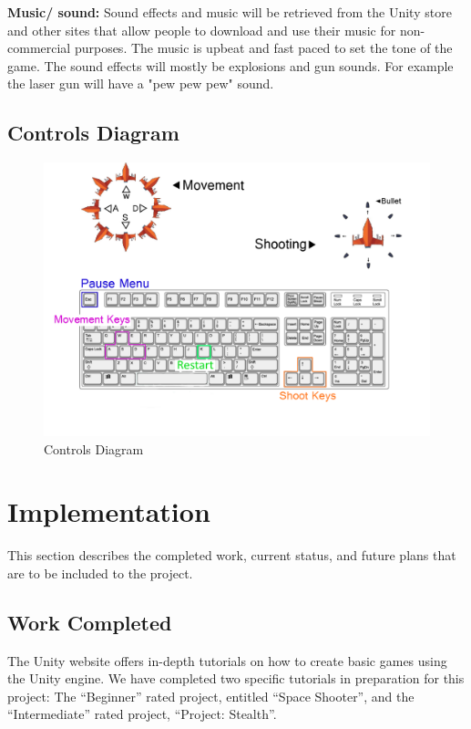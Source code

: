 \documentclass[12pt]{article}       %
\def\hs{\hspace{15pt}}
\begin{document}
	{\bf Music/ sound:} Sound effects and music will be retrieved from the Unity store and other sites that allow people to download and use their music for non-commercial purposes. The music is upbeat and fast paced to set the tone of the game. The sound effects will mostly be explosions and gun sounds. For example the laser gun will have a "pew pew pew" sound. 


\subsection{Controls Diagram}

\begin{figure} [H]
\centering
\includegraphics[width=6.3 in]{ControlDiagramFinal.png}
\caption{Controls Diagram} \label{Controls}
\end{figure}


\section{Implementation} %
\label{sec:history}
This section describes the completed work, current status, and future plans that are to be included to the project.

\subsection{Work Completed}

\hs The Unity website offers in-depth tutorials on how to create basic games using the Unity engine. We have completed two specific tutorials in preparation for this project: The “Beginner” rated project, entitled “Space Shooter”, and the “Intermediate” rated project, “Project: Stealth”.
\end{document}
